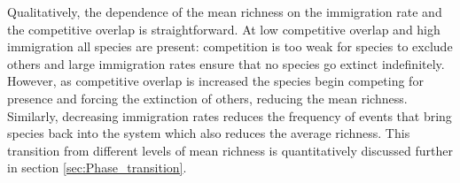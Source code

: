 \documentclass[%
 amsmath,amssymb,
reprint,%
linenumbers]{revtex4-2}
\begin{document}
Qualitatively, the dependence of the mean richness on the immigration rate and the competitive overlap is straightforward.
At low competitive overlap and high immigration all species are present: competition is too weak for species to exclude others and large immigration rates ensure that no species go extinct indefinitely.
However, as competitive overlap is increased the species begin competing for presence and forcing the extinction of others, reducing the mean richness.
Similarly, decreasing immigration rates reduces the frequency of events that bring species back into the system which also reduces the average richness.
This transition from different levels of mean richness is quantitatively discussed further in section \ref{sec:Phase_transition}.




\end{document}
